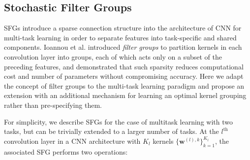 \subsection{Stochastic Filter Groups}
SFGs introduce a sparse connection structure into the architecture of CNN for multi-task learning in order to separate features into task-specific and shared components. Ioannou et al. \cite{ioannou2017deep} introduced \textit{filter groups} to partition kernels in each convolution layer into groups, each of which acts only on a subset of the preceding features, and demonstrated that such sparsity reduces computational cost and number of parameters without compromising accuracy. Here we adapt the concept of filter groups to the multi-task learning paradigm and propose an extension with an additional mechanism for learning an optimal kernel grouping rather than pre-specifying them.

For simplicity, we describe SFGs for the case of multitask learning with two tasks, but can be trivially extended to a larger number of tasks. At the $l^{\text{th}}$ convolution layer in a CNN architecture with $K_l$ kernels $\{\mathbf{w}^{(l),k}\}^{K_l}_{k=1}$, the associated SFG performs two operations: 

